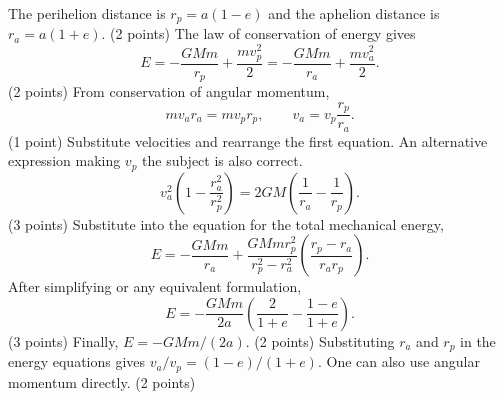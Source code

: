 The perihelion distance is $r_p=a(1-e)$ and the aphelion distance is $r_a=a(1+e)$. \hfill(2 points)
The law of conservation of energy gives
\[E=-\frac{GMm}{r_p}+\frac{mv_p^2}{2}=-\frac{GMm}{r_a}+\frac{mv_a^2}{2}.\]
\hfill(2 points)
From conservation of angular momentum,
\[mv_ar_a=mv_pr_p,\qquad v_a=v_p\frac{r_p}{r_a}.\]
\hfill(1 point)
Substitute velocities and rearrange the first equation. An alternative expression making $v_p$ the subject is also correct.
\[v_a^2\left(1-\frac{r_a^2}{r_p^2}\right)=2GM\left(\frac1{r_a}-\frac1{r_p}\right).\]
\hfill(3 points)
Substitute into the equation for the total mechanical energy,
\[E=-\frac{GMm}{r_a}+\frac{GMmr_p^2}{r_p^2-r_a^2}\left(\frac{r_p-r_a}{r_ar_p}\right).\]
After simplifying or any equivalent formulation,
\[E=-\frac{GMm}{2a}\left(\frac2{1+e}-\frac{1-e}{1+e}\right).\]
\hfill(3 points)
Finally, $E=-GMm/(2a)$. \hfill(2 points)
Substituting $r_a$ and $r_p$ in the energy equations gives $v_a/v_p=(1-e)/(1+e)$. One can also use angular momentum directly. \hfill(2 points)
